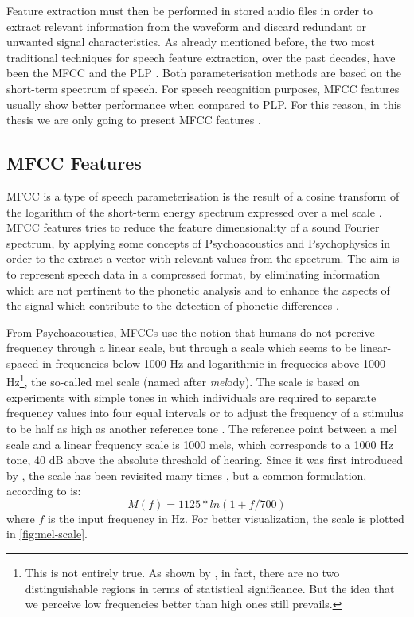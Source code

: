 Feature extraction must then be performed in stored audio files in order to extract relevant information from the waveform and discard redundant or unwanted signal characteristics. As already mentioned before, the two most traditional techniques for speech feature extraction, over the past decades, have been the \ac{MFCC} \cite{Davis1980} and the \ac{PLP} \cite{Hermansky1990}. Both parameterisation methods are based on the short-term spectrum of speech. For speech recognition purposes, \ac{MFCC} features usually show better performance when compared to \ac{PLP}. For this reason, in this thesis we are only going to present \ac{MFCC} features \cite{Mporas2007}.

\subsection{MFCC Features}

\ac{MFCC} is a type of speech parameterisation is the result of a cosine transform of the logarithm of the short-term energy spectrum expressed over a mel scale \cite{Davis1980}. \ac{MFCC} features tries to reduce the feature dimensionality of a sound Fourier spectrum, by applying some concepts of Psychoacoustics and Psychophysics in order to the extract a vector with relevant values from the spectrum. The aim is to represent speech data in a compressed format, by eliminating information which are not pertinent to the phonetic analysis and to enhance the aspects of the signal which contribute to the detection of phonetic differences \cite{Davis1980}.

From Psychoacoustics, \ac{MFCC}s use the notion that humans do not perceive frequency through a linear scale, but through a scale which seems to be linear-spaced in frequencies below 1000 Hz and logarithmic in frequecies above 1000 Hz\footnote{This is not entirely true. As shown by \citet{Umesh1999}, in fact, there are no two distinguishable regions in terms of statistical significance. But the idea that we perceive low frequencies better than high ones still prevails.}, the so-called mel scale (named after \emph{mel}ody). The scale is based on experiments with simple tones in which individuals are required to separate frequency values into four equal intervals or to adjust the frequency of a stimulus to be half as high as another reference tone \cite{Huang2001}. The reference point between a mel scale and a linear frequency scale is 1000 mels, which corresponds to a 1000 Hz tone, 40 dB above the absolute threshold of hearing. Since it was first introduced by \citet{Stevens1937}, the scale has been revisited many times \cite{Umesh1999}, but a common formulation, according to \citet{Huang2001} is:
\begin{equation}
 M(f) = 1125*ln(1 + f / 700)
\end{equation}
where $f$ is the input frequency in Hz. For better visualization, the scale is plotted in \autoref{fig:mel-scale}.

